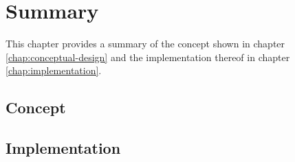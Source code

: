 \chapter{Summary}
\label{chap:summary}
This chapter provides a summary of the concept shown in chapter \ref{chap:conceptual-design} and the implementation thereof in chapter \ref{chap:implementation}.

\section{Concept}
\label{sec:summary-concept}
\section{Implementation}
\label{sec:summary-implementation}